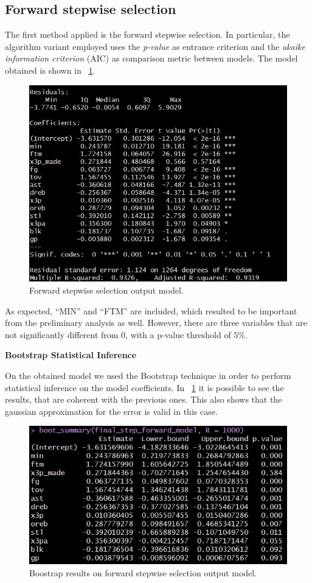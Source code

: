 \subsection{Forward stepwise selection}

The first method applied is the forward stepwise selection. In particular, the algorithm variant employed uses the \textit{p-value} as entrance criterion and the \textit{akaike information criterion} (AIC) as comparison metric between models. The model obtained is shown in \Fig~\ref{fig:ForwardModelSummary}.
\begin{figure}[h]
	\centering
	\includegraphics[width=0.35\linewidth]{ImageFiles/Regression/Forward/ForwardModelSummary}
	\caption{Forward stepwise selection output model.}
	\label{fig:ForwardModelSummary}
\end{figure}

As expected, ``MIN'' and ``FTM'' are included, which resulted to be important from the preliminary analysis as well. However, there are three variables that are not significantly different from 0, with a p-value threshold of $5\%$.

\vspace{0.2cm}
\noindent
\textbf{Bootstrap Statistical Inference}

On the obtained model we used the Bootstrap technique in order to perform statistical inference on the model coefficients. In \Fig~\ref{fig:ForwardModelSummary} it is possible to see the results, that are coherent with the previous ones. This also shows that the gaussian approximation for the error is valid in this case.
\begin{figure}[h]
	\centering
	\includegraphics[width=0.4\linewidth]{ImageFiles/Regression/Forward/BootForwardModel}
	\caption{Boostrap results on forward stepwise selection output model.}
	\label{fig:BootForwardModel}
\end{figure}

